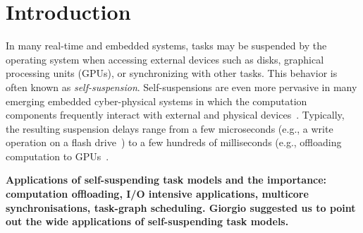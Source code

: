 \section{Introduction}

In many real-time and embedded systems, tasks may be suspended by the operating system when accessing external devices such as disks, graphical processing units (GPUs), or synchronizing with other tasks. 
This behavior is often known as \emph{self-suspension}. Self-suspensions are even more pervasive in many emerging embedded cyber-physical systems in which the computation components frequently interact with external and physical devices~\cite{Kang:rtss07,Kato_2011}. Typically, the resulting suspension delays range from a few microseconds (e.g., a write operation on a flash drive~\cite{Kang:rtss07}) to a few hundreds of milliseconds (e.g., offloading computation to GPUs~\cite{Kato_2011,Liu_2014}.


\textbf{Applications of self-suspending task models and the importance: computation offloading, I/O intensive applications, multicore synchronisations, task-graph scheduling. Giorgio suggested us to point out the wide applications of self-suspending task models.}
  